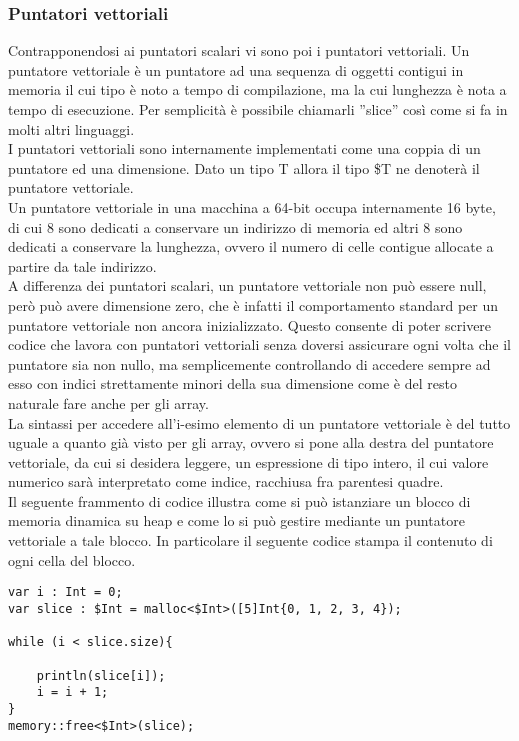 \subsubsection{Puntatori vettoriali}
Contrapponendosi ai puntatori scalari vi sono poi i puntatori vettoriali. Un puntatore vettoriale è un puntatore ad una sequenza 
di oggetti contigui in memoria il cui tipo è noto a tempo di compilazione, ma la cui lunghezza è nota a tempo di esecuzione. Per 
semplicità è possibile chiamarli ”slice” così come si fa in molti altri linguaggi. \\

I puntatori vettoriali sono internamente implementati come una coppia di un puntatore ed una dimensione.  Dato un tipo T allora il tipo \$T ne denoterà 
il puntatore vettoriale. \\

Un puntatore vettoriale in una macchina a 64-bit occupa internamente 16 byte, di cui 8 sono dedicati a conservare un 
indirizzo di memoria ed altri 8 sono dedicati a conservare la lunghezza, ovvero il numero di celle contigue allocate a partire da tale indirizzo. \\

A differenza dei puntatori scalari, un puntatore vettoriale non può essere null, però può avere dimensione zero, che è infatti il comportamento 
standard per un puntatore vettoriale non ancora inizializzato. Questo consente di poter scrivere codice che lavora con puntatori vettoriali senza 
doversi assicurare ogni volta che il puntatore sia non nullo, ma semplicemente controllando di accedere sempre ad esso con indici 
strettamente minori della sua dimensione come è del resto naturale fare anche per gli array. \\

La sintassi per accedere all’i-esimo elemento di un puntatore vettoriale è del tutto uguale a quanto già 
visto per gli array, ovvero si pone alla destra del puntatore vettoriale, da cui si desidera leggere, un espressione di tipo intero, il 
cui valore numerico sarà interpretato come indice, racchiusa fra parentesi quadre. \\

Il seguente frammento di codice illustra come si può istanziare un blocco di memoria dinamica su heap e come lo 
si può gestire mediante un puntatore vettoriale a tale blocco. In particolare il seguente codice stampa il contenuto di ogni cella del 
blocco. \\

\vspace{0.5cm}
\begin{lstlisting}[frame=single]
var i : Int = 0;
var slice : $Int = malloc<$Int>([5]Int{0, 1, 2, 3, 4});

while (i < slice.size){

    println(slice[i]);
    i = i + 1;
}
memory::free<$Int>(slice);
\end{lstlisting}
\vspace{0.5cm}


